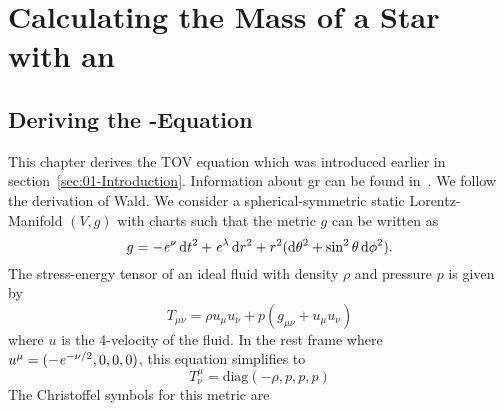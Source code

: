 \section{Calculating the Mass of a Star with an \texorpdfstring{}{EoS}}
\label{sec:3-Mass}
\subsection{Deriving the \texorpdfstring{}{TOV}-Equation}
\label{subsec:3-Mass-Sec-TOVDerivation}
This chapter derives the \ac{TOV} equation which was introduced earlier in section~\ref{sec:01-Introduction}.
Information about \ac{gr} can be found in~\cite{choquet-bruhatAnalysisManifoldsPhysics2000, choquet-bruhatGeneralRelativityEinstein2009, choquet-bruhatIntroductionGeneralRelativity2015, waldGeneralRelativity1984}.
We follow the derivation of Wald.
We consider a spherical-symmetric static Lorentz-Manifold $(V,g)$ with charts such that the metric $g$ can be written as
\begin{equation}
	g=-\mathit{e}^\nu \mathop{}\!\mathrm{d} t^2+\mathit{e}^\lambda \mathop{}\!\mathrm{d} r^2 + r^2(\mathop{}\!\mathrm{d}\theta^2+\sin^2\theta \mathop{}\!\mathrm{d}\phi^2).
\end{equation}
The stress-energy tensor of an ideal fluid with density $\rho$ and pressure $p$ is given by
\begin{equation}
	T_{\mu\nu}=\rho u_\mu u_\nu + p(g_{\mu\nu}+u_\mu u_\nu)
\end{equation}
where $u$ is the 4-velocity of the fluid.
In the rest frame where $u^\mu=(-\mathit{e}^{-\nu/2},0,0,0)$, this equation simplifies to
\begin{equation}
	T^\mu_\nu=\text{diag}(-\rho,p,p,p)
\end{equation}
The Christoffel symbols for this metric are
